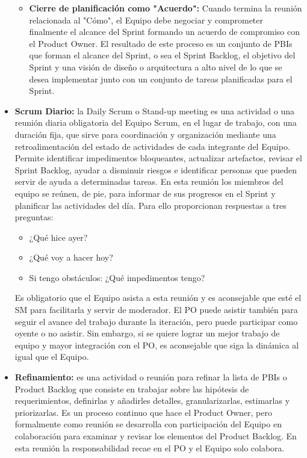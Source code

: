\begin{itemize}
\begin{itemize}
\item \textbf{Cierre de planificación como "Acuerdo":} Cuando termina la reunión relacionada al "Cómo", el Equipo debe negociar y comprometer finalmente el alcance del Sprint formando un acuerdo de compromiso con el Product Owner. El resultado de este proceso es un conjunto de PBIs que forman el alcance del Sprint, o sea el Sprint Backlog, el objetivo del Sprint y una visión de diseño o arquitectura a alto nivel de lo que se desea implementar junto con un conjunto de tareas planificadas para el Sprint.

\end{itemize}

\item \textbf{Scrum Diario:} la Daily Scrum o Stand-up meeting es una actividad o una reunión diaria obligatoria del Equipo Scrum, en el lugar de trabajo, con una duración fija, que sirve para coordinación y organización mediante una retroalimentación del estado de actividades de cada integrante del Equipo. Permite identificar impedimentos bloqueantes, actualizar artefactos, revisar el Sprint Backlog, ayudar a disminuir riesgos e identificar personas que pueden servir de ayuda a determinadas tareas. En esta reunión los miembros del equipo se reúnen, de pie, para informar de sus progresos en el Sprint y planificar las actividades del día. Para ello proporcionan respuestas a tres preguntas:

\begin{itemize}
\item{¿Qué hice ayer?}
\item{¿Qué voy a hacer hoy?}
\item{Si tengo obstáculos: ¿Qué impedimentos tengo?}
\end{itemize}

Es obligatorio que el Equipo asista a esta reunión y es aconsejable que esté el SM para facilitarla y servir de moderador. El PO puede asistir también para seguir el avance del trabajo durante la iteración, pero puede participar como oyente o no asistir. Sin embargo, si se quiere lograr un mejor trabajo de equipo y mayor integración con el PO, es aconsejable que siga la dinámica al igual que el Equipo.

\item \textbf{Refinamiento:} es una actividad o reunión para refinar la lista de PBIs o Product Backlog que consiste en trabajar sobre las hipótesis de requerimientos, definirlas y añadirles detalles, granularizarlas, estimarlas y priorizarlas. Es un proceso continuo que hace el Product Owner, pero formalmente como reunión se desarrolla con participación del Equipo en colaboración para examinar y revisar los elementos del Product Backlog. En esta reunión la responsabilidad recae en el PO y el Equipo solo colabora.


\end{itemize}
